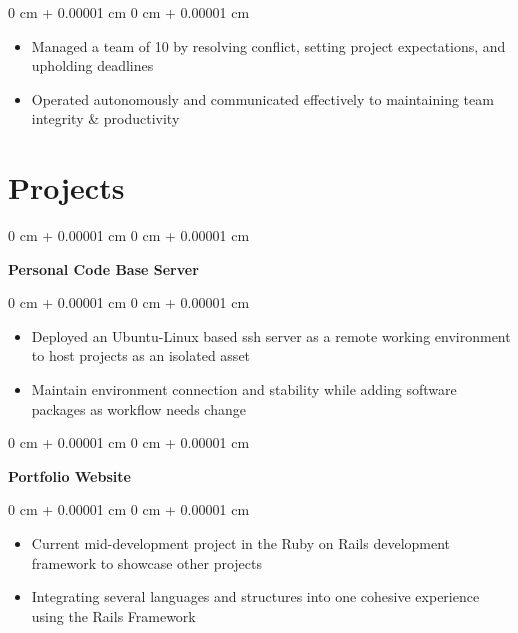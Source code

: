 \documentclass[10pt, letterpaper]{article}
\newenvironment{highlights}{
    \begin{itemize}[
        topsep=0.10 cm,
        parsep=0.10 cm,
        partopsep=0pt,
        itemsep=0pt,
        leftmargin=0 cm + 10pt
    ]
}{
    \end{itemize}
} %
\newenvironment{onecolentry}{
    \begin{adjustwidth}{
        0 cm + 0.00001 cm
    }{
        0 cm + 0.00001 cm
    }
}{
    \end{adjustwidth}
} %
\newenvironment{twocolentry}[2][]{
    \onecolentry%
    \def\secondColumn{#2}
    \setcolumnwidth{\fill, 6.0 cm}
    \begin{paracol}{2}
}{
    \switchcolumn\raggedleft\secondColumn%
    \end{paracol}
    \endonecolentry%
} %
\begin{document}
        \vspace{0.10 cm}
        \begin{onecolentry}
            \begin{highlights}
                \item Managed a team of 10 by resolving conflict, setting project expectations, and upholding deadlines
                \item Operated autonomously and communicated effectively to maintaining team integrity \& productivity
            \end{highlights}
        \end{onecolentry}
    
    {\color{secondaryColor}\section{Projects}}



        
        \begin{onecolentry}
            \textbf{Personal Code Base Server}
        \end{onecolentry}
            
        \vspace{0.10 cm}

        \begin{onecolentry}
            \begin{highlights}
                \item Deployed an Ubuntu-Linux based ssh server as a remote working environment to host projects as an isolated asset
                \item Maintain environment connection and stability while adding software packages as workflow needs change
            \end{highlights}
        \end{onecolentry}



        \vspace{0.2 cm}

        \begin{twocolentry}{
            \href{https://github.com/thatchereames/website}{\color{secondaryColor}{github.com/thatchereames/website}}
        }
            \textbf{Portfolio Website}\end{twocolentry}

        \vspace{0.10 cm}
        \begin{onecolentry}
            \begin{highlights}
                \item Current mid-development project in the Ruby on Rails development framework to showcase other projects
                \item Integrating several languages and structures into one cohesive experience using the Rails Framework
            \end{highlights}
        \end{onecolentry}
\end{document}
